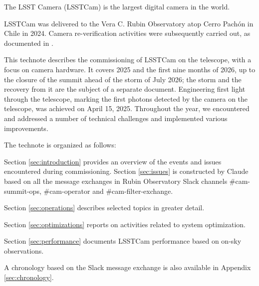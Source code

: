 The LSST Camera (LSSTCam) is the largest digital camera in the world.

LSSTCam was delivered to the Vera C. Rubin Observatory atop Cerro Pachón in Chile in 2024. Camera re-verification activities were subsequently carried out, as documented in \citet{SITCOMTN-148}.

This technote describes the commissioning of LSSTCam on the telescope, with a focus on camera hardware.  It covers 2025 and the first nine months of 2026, up to the closure of the summit ahead of the storm of July 2026; the storm and the recovery from it are the subject of a separate document. Engineering first light through the telescope, marking the first photons detected by the camera on the telescope, was achieved on April 15, 2025. Throughout the year, we encountered and addressed a number of technical challenges and implemented various improvements.

The technote is organized as follows:

Section \ref{sec:introduction} provides an overview of the events and issues encountered during commissioning. Section \ref{sec:issues} is constructed by Claude based on all the message exchanges in Rubin Observatory Slack channels \#cam-summit-ops, \#cam-operator and \#cam-filter-exchange. 

Section \ref{sec:operations} describes selected topics in greater detail.

Section \ref{sec:optimizations} reports on activities related to system optimization.

Section \ref{sec:performance} documents LSSTCam performance based on on-sky observations.

A chronology based on the Slack message exchange is also available in Appendix \ref{sec:chronology}.